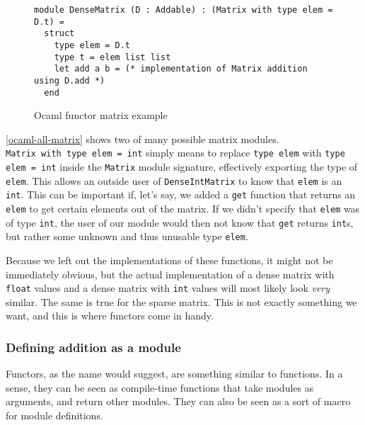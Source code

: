 \begin{figure*}
\begin{verbatim}
module DenseMatrix (D : Addable) : (Matrix with type elem = D.t) =
  struct
    type elem = D.t
    type t = elem list list
    let add a b = (* implementation of Matrix addition using D.add *)
  end
\end{verbatim}
\caption{Ocaml functor matrix example}
\label{ocaml-matrix-functor}
\end{figure*}

\autoref{ocaml-all-matrix} shows two of many possible matrix modules. \\ \verb|Matrix with type elem = int| simply means to replace \verb|type elem| with \verb|type elem = int| inside the \verb|Matrix| module signature, effectively exporting the type of \verb|elem|. This allows an outside user of \verb|DenseIntMatrix| to know that \verb|elem| is an \verb|int|. This can be important if, let's say, we added a \verb|get| function that returns an \verb|elem| to get certain elements out of the matrix. If we didn't specify that \verb|elem| was of type \verb|int|, the user of our module would then not know that \verb|get| returns \verb|int|s, but rather some unknown and thus unusable type \verb|elem|.

Because we left out the implementations of these functions, it might not be immediately obvious, but the actual implementation of a dense matrix with \verb|float| values and a dense matrix with \verb|int| values will most likely look \textit{very} similar. The same is true for the sparse matrix. This is not exactly something we want, and this is where functors come in handy.

\subsubsection{Defining addition as a module}

Functors, as the name would suggest, are something similar to functions. In a sense, they can be seen as compile-time functions that take modules as arguments, and return other modules. They can also be seen as a sort of macro for module definitions.

